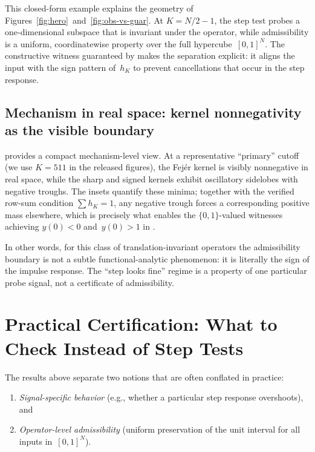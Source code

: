 \documentclass[11pt,a4paper]{article}
\theoremstyle{plain}
\theoremstyle{definition}
\theoremstyle{plain}
\begin{document}
This closed-form example explains the geometry of
Figures~\ref{fig:hero}~and~\ref{fig:obs-vs-guar}.  At $K = N/2-1$, the step test
probes a one-dimensional subspace that is invariant under the operator, while
admissibility is a uniform, coordinatewise property over the full
hypercube~$[0,1]^N$.  The constructive witness guaranteed by 
makes the separation explicit: it aligns the input with the sign pattern
of~$h_K$ to prevent cancellations that occur in the step response.


\subsection{Mechanism in real space: kernel nonnegativity as the visible
  boundary}
\label{sec:real-space-mechanism}

 provides a compact mechanism-level view.  At a
representative ``primary'' cutoff (we use $K = 511$ in the released figures), the
Fej\'er kernel is visibly nonnegative in real space, while the sharp and signed
kernels exhibit oscillatory sidelobes with negative troughs.  The insets quantify
these minima; together with the verified row-sum condition $\sum h_K = 1$, any
negative trough forces a corresponding positive mass elsewhere, which is
precisely what enables the $\{0,1\}$-valued witnesses achieving $y(0) < 0$
and~$y(0) > 1$ in .

In other words, for this class of translation-invariant operators the
admissibility boundary is not a subtle functional-analytic phenomenon: it is
literally the sign of the impulse response.  The ``step looks fine'' regime is a
property of one particular probe signal, not a certificate of admissibility.


\section{Practical Certification: What to Check Instead of Step Tests}
\label{sec:certification}

The results above separate two notions that are often conflated in practice:
\begin{enumerate}[label=\arabic*.,leftmargin=2em]
  \item \emph{Signal-specific behavior} (e.g., whether a particular step
    response overshoots), and
  \item \emph{Operator-level admissibility} (uniform preservation of the unit
    interval for all inputs in~$[0,1]^N$).
\end{enumerate}
\end{document}
